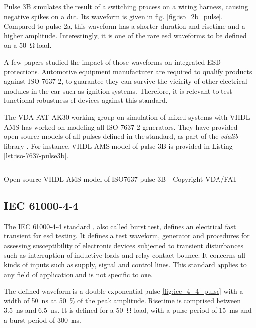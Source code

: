 Pulse 3B simulates the result of a switching process on a wiring harness, causing negative spikes on a \gls{dut}.
Its waveform is given in fig. \ref{fig:iso_2b_pulse}.
Compared to pulse 2a, this waveform has a shorter duration and risetime and a higher amplitude.
Interestingly, it is one of the rare \gls{esd} waveforms to be defined on a \SI{50}{\ohm} load.

A few papers \cite{is-iso7637-real, iso7637-2-new-automotive-reqs, robustness-esd-iso7637} studied the impact of those waveforms on integrated ESD protections.
Automotive equipment manufacturer are required to qualify products against ISO 7637-2, to guarantee they can survive the vicinity of other electrical modules in the car such as ignition systems.
Therefore, it is relevant to test functional robustness of devices against this standard.

The VDA FAT-AK30 working group on simulation of mixed-systems with VHDL-AMS \cite{fat-ak30} has worked on modeling all ISO 7637-2 generators. They have provided open-source models of all pulses defined in the standard, as part of the \textit{vdalib} library \cite{vdalib}.
For instance, VHDL-AMS model of pulse 3B is provided in Listing \ref{lst:iso-7637-pulse3b}.

\begin{code}
\inputminted[frame=single,firstline=157,lastline=228]{VHDL}{src/1/snippets/iso_7637_pulse3b.vhd}
\caption{Open-source VHDL-AMS model of ISO7637 pulse 3B - Copyright VDA/FAT}
\label{lst:iso-7637-pulse3b}
\end{code}


\subsection{IEC 61000-4-4}

The IEC 61000-4-4 standard \cite{iec61000-4-4}, also called burst test, defines an electrical fast transient for \gls{esd} testing.
It defines a test waveform, generator and procedures for assessing susceptibility of electronic devices subjected to transient disturbances such as interruption of inductive loads and relay contact bounce.
It concerns all kinds of inputs such as supply, signal and control lines.
This standard applies to any field of application and is not specific to one.

The defined waveform is a double exponential pulse \ref{fig:iec_4_4_pulse} with a width of \SI{50}{\nano\second} at \SI{50}{\percent} of the peak amplitude.
Risetime is comprised between \SI{3.5}{\nano\second} and \SI{6.5}{\nano\second}.
It is defined for a \SI{50}{\ohm} load, with a pulse period of \SI{15}{\milli\second} and a burst period of \SI{300}{\milli\second}.


